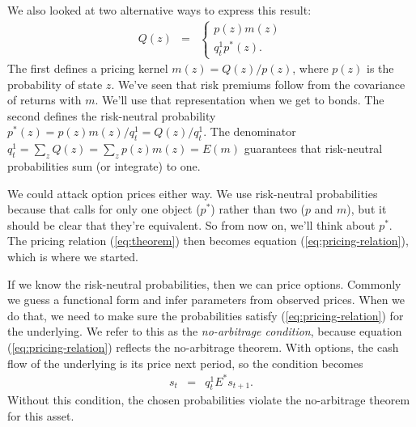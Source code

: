 \documentclass[11pt]{article}
\begin{document}
We also looked at two alternative ways to express this result:
\begin{eqnarray*}
    Q(z) &=& \left\{
                \begin{array}{l}
                    p(z) m(z) \\
                    q^1_t p^*(z) .
                \end{array}
            \right.
\end{eqnarray*}
The first defines a pricing kernel $m(z) = Q(z)/p(z)$,
where $p(z)$ is the probability of state $z$.
We've seen that risk premiums follow from the covariance of returns with $m$.
We'll use that representation when we get to bonds.
The second defines the risk-neutral probability
$p^*(z) = p(z)m(z)/q_t^1 = Q(z)/q^1_t$.
The denominator $q_t^1 = \sum_z Q(z) = \sum_z p(z) m(z) = E(m)$ guarantees
that risk-neutral probabilities sum (or integrate) to one.

We could attack option prices either way.
We use risk-neutral probabilities because
that calls for only one object ($p^*$)
rather than two ($p$ and $m$), but it should be clear that
they're equivalent.
So from now on, we'll think about $p^*$.
The pricing relation (\ref{eq:theorem}) then becomes
equation (\ref{eq:pricing-relation}), which is where we started.

If we know the risk-neutral probabilities, then we can price options.
Commonly we guess a functional form and infer parameters from observed prices.
When we do that, we need to make sure the probabilities satisfy
 (\ref{eq:pricing-relation}) for the underlying.
 We refer to this as the {\it no-arbitrage condition\/},
 because equation  (\ref{eq:pricing-relation}) reflects the no-arbitrage theorem.
With options, the cash flow of the underlying is its price next period,
so the condition becomes
\begin{eqnarray}
    s_t  &=&  q^1_t  E^* s_{t+1} .
    \label{eq:arb-condition}
\end{eqnarray}
Without this condition,
the chosen probabilities violate the no-arbitrage theorem for this asset.
\end{document}
